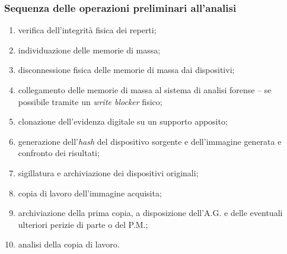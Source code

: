 \documentclass[11pt]{beamer}
\begin{document}
	\begin{frame}
		\frametitle{Sequenza delle operazioni preliminari all'analisi}
		
		\begin{enumerate}
			\item verifica dell'integrità fisica dei reperti;
			\item individuazione delle memorie di massa;
			\item disconnessione fisica delle memorie di massa dai dispositivi;
			\item collegamento delle memorie di massa al sistema di analisi forense -- se possibile tramite un \textit{write blocker} fisico;
			\item clonazione dell'evidenza digitale su un supporto apposito;
			\item generazione dell'\textit{hash} del dispositivo sorgente e dell'immagine generata e confronto dei risultati;
			\item sigillatura e archiviazione dei dispositivi originali;
			\item copia di lavoro dell'immagine acquisita;
			\item archiviazione della prima copia, a disposizione dell'A.G. e delle eventuali ulteriori perizie di parte o del P.M.;
			\item analisi della copia di lavoro.
		\end{enumerate}
		
	\end{frame}
	
\end{document}
